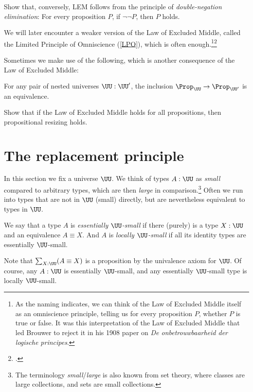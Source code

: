 
\begin{xca}\label{xca:dne-lem}
  Show that, conversely, LEM follows from the principle of
  \emph{double-negation elimination}:
  For every proposition $P$, if $\neg \neg P$, then $P$ holds.
\end{xca}

\begin{remark}
  We will later encounter a weaker version of the Law of Excluded Middle, called the Limited
  Principle of Omniscience (\cref{LPO}), which is often enough.\footnote{%
    As the naming indicates, we can think of the Law of Excluded Middle itself as an omniscience
    principle, telling us for every proposition $P$,
    whether $P$ is true or false.
    It was this interpretation of the Law of Excluded Middle that led Brouwer to reject it
    in his 1908 paper on \emph{De onbetrouwbaarheid der logische
      principes}.\footnotemark{}}\footcitetext{Brouwer-1908}
\end{remark}

Sometimes we make use of the following,
which is another consequence of the Law of Excluded Middle:
\begin{principle}
  \label{pri:prop-resizing}
  For any pair of nested universes $\UU:\UU'$, the inclusion
  $\Prop_\UU \to \Prop_{\UU'}$ is an equivalence.
\end{principle}
\begin{xca}\label{xca:lem-prop-sizing}
  Show that if the Law of Excluded Middle holds for all propositions,
  then propositional resizing holds.
\end{xca}


\section{The replacement principle}
\label{sec:replacement}

In this section we fix a universe $\UU$.
We think of types $A:\UU$ as \emph{small} compared to arbitrary types,
which are then \emph{large} in comparison.\footnote{%
  The terminology \emph{small}/\emph{large} is also known from set theory,
  where classes are large collections,
  and sets are small collections.}
Often we run into types that are not in $\UU$ (small) directly,
but are nevertheless equivalent to types in $\UU$.
\begin{definition}\label{def:ess-loc-small}
  We say that a type $A$ is \emph{essentially $\UU$-small} if there
  (purely) is a type $X:\UU$ and an equivalence $A \equiv
  X$. And $A$ is \emph{locally $\UU$-small} if all its identity types
  are essentially $\UU$-small.
\end{definition}
Note that $\sum_{X:\UU}(A \equiv X)$ is a proposition by the univalence axiom for $\UU$.
Of course, any $A:\UU$ is essentially $\UU$-small,
and any essentially $\UU$-small type is locally $\UU$-small.

